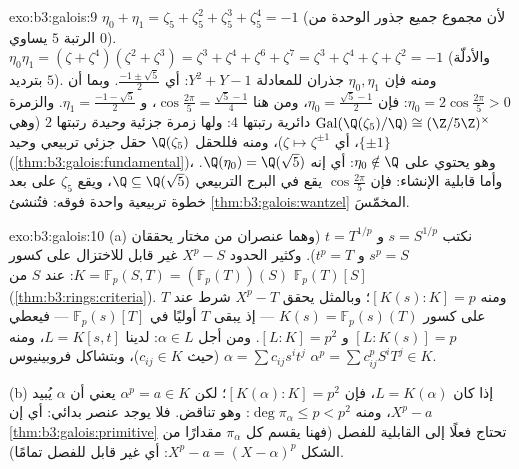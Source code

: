 \begin{solution}{exo:b3:galois:9}
$\eta_0 + \eta_1 = \zeta_5 + \zeta_5^2 + \zeta_5^3 + \zeta_5^4 =
-1$ (لأن مجموع جميع جذور الوحدة من الرتبة $5$ يساوي $0$).
$\eta_0\eta_1 =
(\zeta + \zeta^4)(\zeta^2 + \zeta^3) = \zeta^3 + \zeta^4 +
\zeta^6 + \zeta^7 = \zeta^3 + \zeta^4 + \zeta + \zeta^2 = -1$ (والأدلّة بترديد $5$). ومنه فإن $\eta_0, \eta_1$ جذران
للمعادلة $Y^2 + Y
- 1$: أي $\frac{-1 \pm \sqrt5}2$. وبما أن $\eta_0 =
2\cos\frac{2\pi}5 > 0$: فإن $\eta_0 = \frac{\sqrt5 - 1}2$، ومن هنا
$\cos\frac{2\pi}5 = \frac{\sqrt5 - 1}4$، و $\eta_1 =
\frac{-1-\sqrt5}2$. والزمرة $\operatorname{Gal}(\Q(\zeta_5)/\Q) \cong (\Z/5\Z)^\times$ دائرية رتبتها $4$: ولها
زمرة جزئية \emph{وحيدة} رتبتها $2$ (وهي $\{\pm 1\}$، أي $\zeta \mapsto \zeta^{\pm1}$)،
ومنه فللحقل $\Q(\zeta_5)$ حقل جزئي تربيعي وحيد (\cref{thm:b3:galois:fundamental})، وهو
يحتوي على $\eta_0
\notin \Q$: أي إنه $\Q(\eta_0) = \Q(\sqrt5)$. وأما قابلية الإنشاء: فإن
$\cos\frac{2\pi}5$ يقع في البرج التربيعي $\Q \subseteq
\Q(\sqrt5)$، ويقع $\zeta_5$ على بعد
خطوة تربيعية واحدة فوقه: فتُنشئ \cref{thm:b3:galois:wantzel} المخمّسَ.
\end{solution}

\begin{solution}{exo:b3:galois:10}
(a) نكتب $s = S^{1/p}$ و $t = T^{1/p}$ (وهما عنصران من 
مختار يحققان $s^p = S$ و $t^p = T$). وكثير الحدود $X^p - S$ غير
قابل للاختزال على كسور $K = \mathbb F_p(S, T) = (\mathbb
F_p(T))(S)$:  عند  $S$
من  $\mathbb F_p(T)[S]$ (\cref{thm:b3:rings:criteria}). ومنه
$[K(s):K] = p$؛ وبالمثل يحقق $X^p - T$ شرط  عند $T$ على
كسور $K(s) = \mathbb F_p(s)(T)$ --- إذ يبقى $T$ أوليًا في $\mathbb F_p(s)[T]$ --- فيعطي
$[L : K(s)] = p$ و $[L:K] =
p^2$. ومن أجل $\alpha \in L$: لدينا
$L = K[s, t]$، ومنه $\alpha = \sum
c_{ij}s^it^j$ (حيث $c_{ij} \in K$)، وبتشاكل
فروبينيوس $\alpha^p = \sum c_{ij}^p S^iT^j \in K$.

(b) إذا كان $L = K(\alpha)$، فإن $[K(\alpha):K] = p^2$؛ لكن $\alpha^p = a \in K$ يعني أن
$\alpha$ يُبيد $X^p - a$، ومنه $\deg\pi_\alpha \leq p < p^2$: وهو تناقض. فلا يوجد عنصر
بدائي: أي إن \cref{thm:b3:galois:primitive} تحتاج فعلًا إلى القابلية للفصل (فهنا
يقسم كل $\pi_\alpha$ مقدارًا من الشكل $X^p - a =
(X - \alpha)^p$: أي غير قابل للفصل
تمامًا).
\end{solution}

